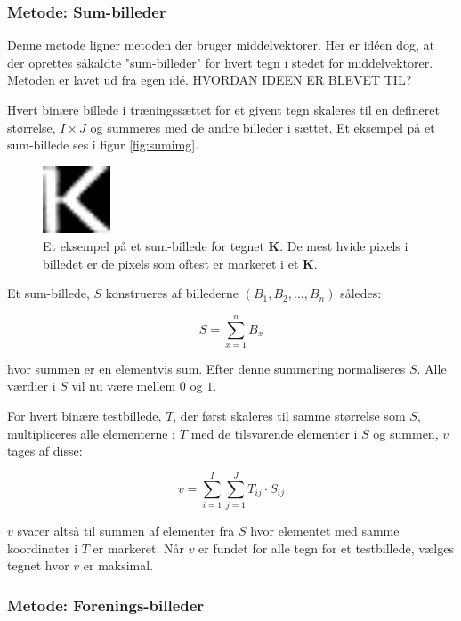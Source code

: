 \subsubsection*{Metode: Sum-billeder}

Denne metode ligner metoden der bruger middelvektorer. Her er idéen dog, at der oprettes såkaldte "sum-billeder" for hvert tegn i stedet for middelvektorer. Metoden er lavet ud fra egen idé. HVORDAN IDEEN ER BLEVET TIL?

Hvert binære billede i træningssættet for et givent tegn skaleres til en defineret størrelse, $I \times J$ og summeres med de andre billeder i sættet. Et eksempel på et sum-billede ses i figur \vref{fig:sumimg}.

\begin{figure}[htp]
\centering
\includegraphics[width=2cm]{system/illu/sumimg.png} 
\caption{Et eksempel på et sum-billede for tegnet \textbf{K}. De mest hvide pixels i billedet er de pixels som oftest er markeret i et \textbf{K}.}
\label{fig:sumimg}
\end{figure}

Et sum-billede, $S$ konstrueres af billederne $(B_{1},B_{2},...,B_{n})$ således:

\begin{displaymath}
	S = \sum_{x=1}^n{B_x}
\end{displaymath}

hvor summen er en elementvis sum. Efter denne summering normaliseres $S$. Alle værdier i $S$ vil nu være mellem $0$ og $1$.

For hvert binære testbillede, $T$, der først skaleres til samme størrelse som $S$, multipliceres alle elementerne i $T$ med de tilsvarende elementer i $S$ og summen, $v$ tages af disse:

\begin{displaymath}
	v = \sum_{i=1}^I{\sum_{j=1}^J{T_{ij} \cdot S_{ij}}}
\end{displaymath}

$v$ svarer altså til summen af elementer fra $S$ hvor elementet med samme koordinater i $T$ er markeret. Når $v$ er fundet for alle tegn for et testbillede, vælges tegnet hvor $v$ er maksimal.

\subsubsection*{Metode: Forenings-billeder}

